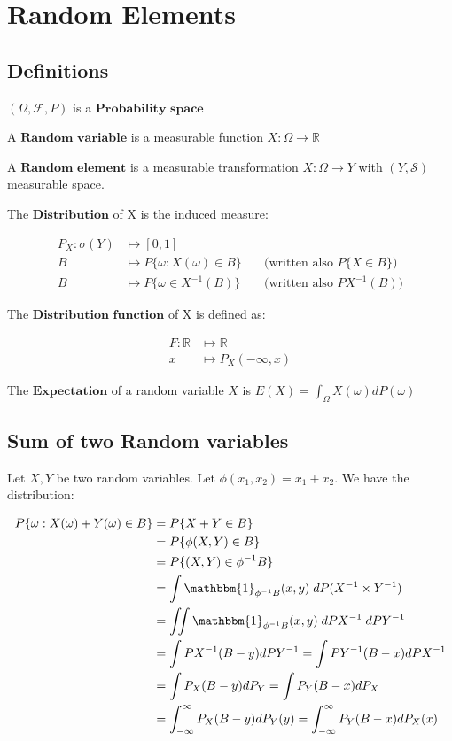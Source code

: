
\section{Random Elements}

\subsection{Definitions}

$(\Omega, \mathcal{F}, P)$ is a $\textbf{Probability space}$

\noindent A $\textbf{Random variable}$ is a measurable function $X : \Omega \rightarrow \mathbb{R}$

\noindent A $\textbf{Random element}$ is a measurable transformation $X : \Omega \rightarrow Y$ with $(Y, \mathcal{S})$ measurable space.

\noindent The $\textbf{Distribution}$ of X is the induced measure:

\begin{align*}
P_X : \sigma(Y) &\longmapsto [0,1] \\
    B &\longmapsto P\{\omega: X(\omega) \in B\} \quad &\text{(written also $P\{X \in B\}$)} \\
B &\longmapsto P\{\omega \in X^{-1}(B)\} &\text{(written also $PX^{-1}(B)$)}
\end{align*}

\noindent The $\textbf{Distribution function}$ of X is defined as: 

\begin{align*}
    F:\mathbb{R} &\longmapsto \mathbb{R} \\
x &\longmapsto P_X(-\infty, x)
\end{align*}

\noindent The $\textbf{Expectation}$ of a random variable $X$ is $E(X) = \displaystyle\int_{\Omega} X(\omega)dP(\omega)$


\subsection{Sum of two Random variables}
Let $X,Y$ be two random variables. Let $\phi(x_1,x_2) = x_1 + x_2$. We have the distribution:

\begin{align*}
P\{\omega: X(\omega)+Y(\omega) \in B\} &= P\{X+Y \in B\} \\
&= P\{\phi(X,Y) \in B\} \\
&= P\{(X,Y) \in \phi^{-1}B\} \\
&= \int \mathbbm{1}_{\phi^{-1}B}(x,y)\;dP(X^{-1}\times Y^{-1}) \\
&= \iint \mathbbm{1}_{\phi^{-1}B}(x,y)\;dPX^{-1}\; dPY^{-1} \\
&= \int PX^{-1}(B-y) dPY^{-1} = \int PY^{-1}(B-x) dPX^{-1} \\
&= \int P_X(B-y) dP_Y = \int P_Y(B-x) dP_X \\
&= \int_{-\infty}^{\infty} P_X(B-y) dP_Y(y) = \int_{-\infty}^{\infty} P_Y(B-x) dP_X(x) \\
\end{align*}

